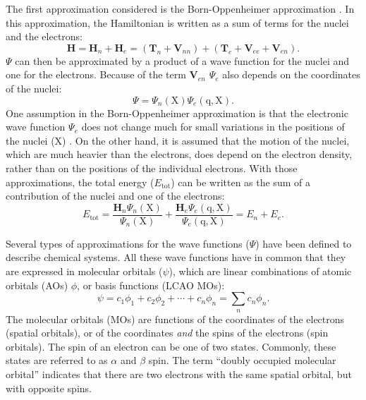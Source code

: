 The first approximation considered is the Born-Oppenheimer approximation \cite{born}. In this approximation, the Hamiltonian is written as a sum of terms for the nuclei and the electrons:
\begin{equation}
\mathbf{H} = \mathbf{H}_n + \mathbf{H}_e = (\mathbf{T}_n + \mathbf{V}_{nn}) + (\mathbf{T}_e + \mathbf{V}_{ee} + \mathbf{V}_{en}).
\label{ch1.eq.hsplit}
\end{equation}
$\Psi$ can then be approximated by a product of a wave function for the nuclei and one for the electrons. Because of the term $\mathbf{V}_{en}$ $\Psi_{e}$ also depends on the coordinates of the nuclei:
\begin{equation}
\Psi = \Psi_{n}(\mathrm{X}) \Psi_{e}(\mathrm{q,X}).
\end{equation}
One assumption in the Born-Oppenheimer approximation is that the electronic wave function $\Psi_{e}$ does not change much for small variations in the positions of the nuclei ($\mathrm{X}$) \cite{born}. On the other hand, it is assumed that the motion of the nuclei, which are much heavier than the electrons, does depend on the electron density, rather than on the positions of the individual electrons. With those approximations, the total energy ($E_\mathrm{tot}$) can be written as the sum of a contribution of the nuclei and one of the electrons:
\begin{equation}
E_\mathrm{tot} = \frac{\mathbf{H}_n \Psi_n(\mathrm{X})}{\Psi_n(\mathrm{X})} + \frac{\mathbf{H}_e \Psi_e(\mathrm{q,X})}{\Psi_e(\mathrm{q,X})} = E_{n} + E_{e}.
\end{equation}

Several types of approximations for the wave functions ($\Psi$) have been defined to describe chemical systems. All these wave functions have in common that they are expressed in molecular orbitals ($\psi$), which are linear combinations of atomic orbitals (AOs) $\phi$, or basis functions (LCAO MOs):
\begin{equation}
\psi = c_1 \phi_1 + c_2 \phi_2 + \cdots + c_n \phi_n = \sum_n c_n \phi_n.
\label{ch1.eq.lcaomo}
\end{equation}
The molecular orbitals (MOs) are functions of the coordinates of the electrons (spatial orbitals), or of the coordinates \textit{and} the spins of the electrons (spin orbitals). The spin of an electron can be one of two states. Commonly, these states are referred to as $\alpha$ and $\beta$ spin. The term ``doubly occupied molecular orbital'' indicates that there are two electrons with the same spatial orbital, but with opposite spins.

